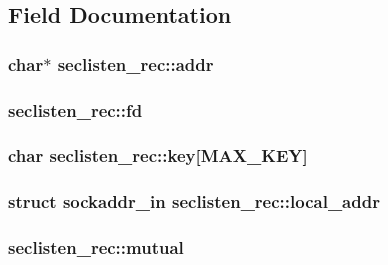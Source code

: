 \subsection{Field Documentation}
\subsubsection[{\texorpdfstring{addr}{addr}}]{\setlength{\rightskip}{0pt plus 5cm}char$\ast$ seclisten\+\_\+rec\+::addr}\hypertarget{structseclisten__rec_ab9c259cc9223b7c11159c6682bc4c177}{}\label{structseclisten__rec_ab9c259cc9223b7c11159c6682bc4c177}
\subsubsection[{\texorpdfstring{fd}{fd}}]{ seclisten\+\_\+rec\+::fd}\hypertarget{structseclisten__rec_ac41e9f425cf2ea41ae9f59a910d83c8c}{}\label{structseclisten__rec_ac41e9f425cf2ea41ae9f59a910d83c8c}
\subsubsection[{\texorpdfstring{key}{key}}]{\setlength{\rightskip}{0pt plus 5cm}char seclisten\+\_\+rec\+::key\mbox{[}{\bf M\+A\+X\+\_\+\+K\+EY}\mbox{]}}\hypertarget{structseclisten__rec_a65c9b11188aa20bd5efafc1a54afe3b5}{}\label{structseclisten__rec_a65c9b11188aa20bd5efafc1a54afe3b5}
\subsubsection[{\texorpdfstring{local\+\_\+addr}{local_addr}}]{\setlength{\rightskip}{0pt plus 5cm}struct sockaddr\+\_\+in seclisten\+\_\+rec\+::local\+\_\+addr}\hypertarget{structseclisten__rec_a3a901575255c6df174c85723a8317673}{}\label{structseclisten__rec_a3a901575255c6df174c85723a8317673}
\subsubsection[{\texorpdfstring{mutual}{mutual}}]{ seclisten\+\_\+rec\+::mutual}\hypertarget{structseclisten__rec_af29fd0e9a90100e28af3747038191f4a}{}\label{structseclisten__rec_af29fd0e9a90100e28af3747038191f4a}
